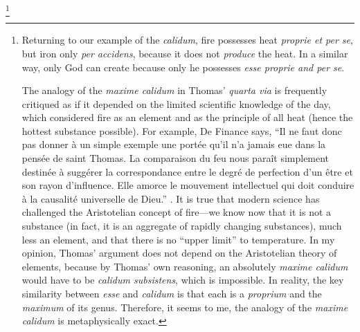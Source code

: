 \footnote{Returning to our example of the \emph{calidum}, fire possesses heat \emph{proprie et per se}, but iron only \emph{per accidens}, because it does not \emph{produce} the heat. In a similar way, only God can create because only he possesses \emph{esse proprie and per se}.

The analogy of the \emph{maxime calidum} in Thomas' \emph{quarta via} is frequently critiqued as if it depended on the limited scientific knowledge of the day, which considered fire as an element and as the principle of all heat (hence the hottest substance possible). For example, De Finance says, ``Il ne faut donc pas donner à un simple exemple une portée qu'il n'a jamais eue dans la pensée de saint Thomas. La comparaison du feu nous paraît simplement destinée à suggérer la correspondance entre le degré de perfection d'un être et son rayon d'influence. Elle amorce le mouvement intellectuel qui doit conduire à la causalité universelle de Dieu.'' \parencite[125]{definance:etre-et-agir}. It is true that modern science has challenged the Aristotelian concept of fire---we know now that it is not a substance (in fact, it is an aggregate of rapidly changing substances), much less an element, and that there is no ``upper limit'' to temperature. In my opinion, Thomas' argument does not depend on the Aristotelian theory of elements, because by Thomas' own reasoning, an absolutely \emph{maxime calidum} would have to be \emph{calidum subsistens}, which is impossible. In reality, the key similarity between \emph{esse} and \emph{calidum} is that each is a \emph{proprium} and the \emph{maximum} of its genus. Therefore, it seems to me, the analogy of the \emph{maxime calidum} is metaphysically exact.}

